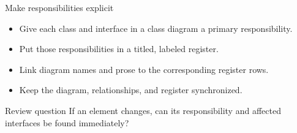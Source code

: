 \begin{frame}{Make responsibilities explicit}
\begin{itemize}
  \item Give each class and interface in a class diagram a primary responsibility.
  \item Put those responsibilities in a titled, labeled register.
  \item Link diagram names and prose to the corresponding register rows.
  \item Keep the diagram, relationships, and register synchronized.
\end{itemize}
\begin{slidecallout}{Review question}
If an element changes, can its responsibility and affected interfaces be found immediately?
\end{slidecallout}
\end{frame}

